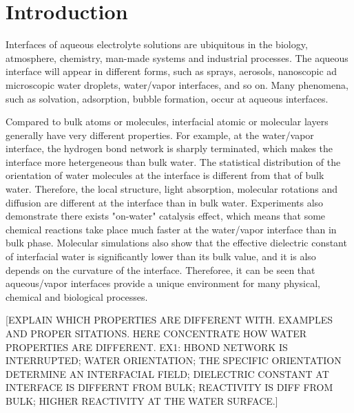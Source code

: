 \chapter{Introduction}\label{CHAPTER_1}


Interfaces of aqueous electrolyte solutions are ubiquitous in the biology, atmosphere, chemistry, man-made systems 
and industrial processes\cite{Irwin88,Tobias99, Benderskii00, 
Asahi01,Benderskii02,Richmond02,LiuH04,
TianCS08,Yamamoto2008, Salmeron2009,ZhangLY09,
LoNostro2012,Piatkowski2014,Balajka2018}.
The aqueous interface will appear in different forms, such as sprays, aerosols, nanoscopic ad  microscopic water droplets, water/vapor interfaces, and so on.
Many phenomena, such as solvation\cite{Benjamin1996}, adsorption\cite{Chang06}, bubble formation\cite{Craig1993,Craig1993b,Weissenborn1995,Marcelja04,Craig04},
occur at aqueous interfaces\cite{Ball2008,Kuo2004b}. 

Compared to bulk atoms or molecules, interfacial atomic or molecular layers generally have very different properties. 
For example, at the water/vapor interface, the hydrogen bond network is sharply terminated, which makes the interface more hetergeneous 
than bulk water\cite{singh2013}. 
The statistical distribution of the orientation of water molecules at the interface is different from that of bulk water.
Therefore, the local structure, light absorption,  molecular rotations and diffusion are different at the interface than in bulk water\cite{Jedlovszky2004}.
Experiments also demonstrate there exists "on-water" catalysis effect, which means that some chemical reactions take place much faster at the water/vapor 
interface than in bulk phase\cite{Rideout1980,Narayan2005,Beattie2010}.
Molecular simulations also show that the effective dielectric constant of interfacial water is significantly lower than its bulk value, 
and it is also depends on the curvature of the interface\cite{Dinpajooh2016}. 
Thereforee, it can be seen that aqueous/vapor interfaces provide a unique environment for many physical, chemical and biological processes. 

[EXPLAIN WHICH PROPERTIES ARE DIFFERENT WITH. EXAMPLES AND PROPER SITATIONS. HERE CONCENTRATE
HOW WATER PROPERTIES ARE DIFFERENT.
EX1: HBOND NETWORK IS INTERRUPTED;
WATER ORIENTATION;
THE SPECIFIC ORIENTATION DETERMINE AN INTERFACIAL FIELD;
DIELECTRIC CONSTANT AT INTERFACE IS DIFFERNT FROM BULK;
REACTIVITY IS DIFF FROM BULK;
HIGHER REACTIVITY AT THE WATER SURFACE.]

